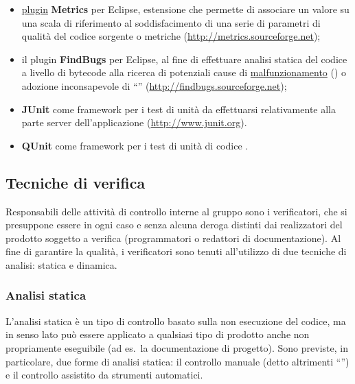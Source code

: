 {\begin{itemize}
  \item \underline{plugin} \textbf{Metrics} per Eclipse, estensione che permette di associare un valore su una scala di riferimento al soddisfacimento di una serie di parametri di qualità del codice sorgente o metriche (\url{http://metrics.sourceforge.net});
  \item il plugin \textbf{FindBugs} per Eclipse, al fine di effettuare analisi statica del codice a livello di bytecode alla ricerca di potenziali cause di \underline{malfunzionamento} () o adozione inconsapevole di ``'' (\url{http://findbugs.sourceforge.net});
  \item \textbf{JUnit} come framework per i test di unità da effettuarsi relativamente alla parte server dell'applicazione (\url{http://www.junit.org}).
  \item \textbf{QUnit} come framework per i test di unità di codice . 
\end{itemize}

\subsection{Tecniche di verifica}
Responsabili delle attività di controllo interne al gruppo sono i verificatori, che si presuppone essere in ogni caso e senza alcuna deroga distinti dai realizzatori del prodotto soggetto a verifica (programmatori o redattori di documentazione). Al fine di garantire la qualità, i verificatori sono tenuti all'utilizzo di due tecniche di analisi: statica e dinamica.

\subsubsection{Analisi statica}
\label{analisi_statica}
L'analisi statica è un tipo di controllo basato sulla non esecuzione del codice, ma in senso lato può essere applicato a qualsiasi tipo di prodotto anche non propriamente eseguibile (ad es.~la documentazione di progetto). Sono previste, in particolare, due forme di analisi statica: il controllo manuale (detto altrimenti ``'') e il controllo assistito da strumenti automatici.

}
